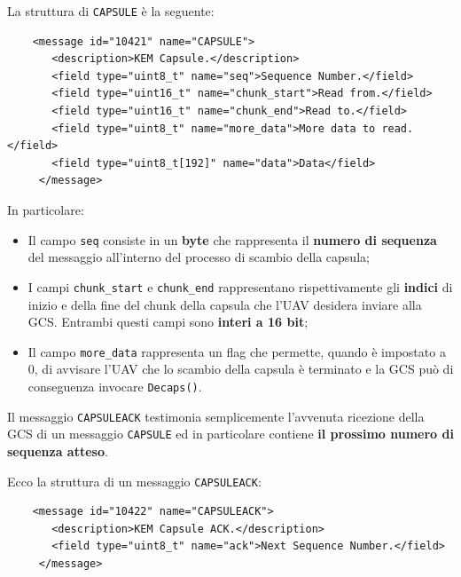 \documentclass[a4paper, 12pt, oneside]{article}
\theoremstyle{definition}
\begin{document}
La struttura di \texttt{CAPSULE} è la seguente:

\begin{verbatim}
    <message id="10421" name="CAPSULE">
       <description>KEM Capsule.</description>
       <field type="uint8_t" name="seq">Sequence Number.</field>
       <field type="uint16_t" name="chunk_start">Read from.</field>
       <field type="uint16_t" name="chunk_end">Read to.</field>
       <field type="uint8_t" name="more_data">More data to read.</field>
       <field type="uint8_t[192]" name="data">Data</field>
     </message>
\end{verbatim}

In particolare:

\begin{itemize}
    \item Il campo \texttt{seq} consiste in un \textbf{byte} che rappresenta il \textbf{numero di sequenza} del messaggio all'interno del processo di scambio della capsula;
    \item I campi \texttt{chunk\_start} e \texttt{chunk\_end} rappresentano rispettivamente gli \textbf{indici} di inizio e della fine del chunk della capsula che l'UAV desidera inviare alla GCS. Entrambi questi campi sono \textbf{interi a 16 bit};
    \item Il campo \texttt{more\_data} rappresenta un flag che permette, quando è impostato a 0, di avvisare l'UAV che lo scambio della capsula è terminato e la GCS può di conseguenza invocare \texttt{Decaps()}.
\end{itemize}

Il messaggio \texttt{CAPSULEACK} testimonia semplicemente l'avvenuta ricezione della GCS di un messaggio \texttt{CAPSULE} ed in particolare contiene \textbf{il prossimo numero di sequenza atteso}.

Ecco la struttura di un messaggio \texttt{CAPSULEACK}:

\begin{verbatim}
    <message id="10422" name="CAPSULEACK">
       <description>KEM Capsule ACK.</description>
       <field type="uint8_t" name="ack">Next Sequence Number.</field>
     </message>
\end{verbatim}

\newpage
\end{document}
